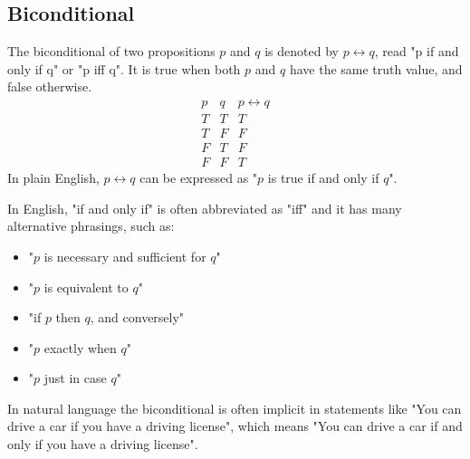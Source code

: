 \subsection{Biconditional}
\begin{definition}[Biconditional]
    The biconditional of two propositions $p$ and $q$ is denoted by $p \leftrightarrow q$, read "p if and only if q" or "p iff q". It is true when both $p$ and $q$ have the same truth value, and false otherwise.
    \[
        \begin{array}{c|c|c}
            p & q & p \leftrightarrow q \\
            \hline
            T & T & T \\
            T & F & F \\
            F & T & F \\
            F & F & T
        \end{array}
    \]
    In plain English, $p \leftrightarrow q$ can be expressed as "$p$ is true if and only if $q$".
\end{definition}
$$$$
In English, "if and only if" is often abbreviated as "iff" and it has many alternative phrasings, such as:
\begin{itemize}[itemsep=1pt,label=$\circ$]
    \item "$p$ is necessary and sufficient for $q$"
    \item "$p$ is equivalent to $q$"
    \item "if $p$ then $q$, and conversely"
    \item "$p$ exactly when $q$"
    \item "$p$ just in case $q$"
\end{itemize}
In natural language the biconditional is often implicit in statements like "You can drive a car if you have a driving license", which means "You can drive a car if and only if you have a driving license".


